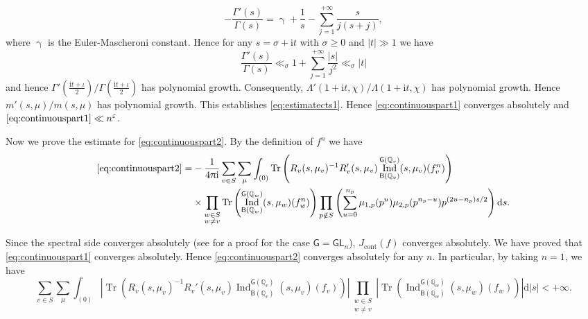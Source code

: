 \documentclass[10pt,oneside,reqno]{amsart}
\makeatletter
\newcommand\rmd{\mathrm{d}}
\newcommand\rmi{\mathrm{i}}
\newcommand\QQ{\mathbb{Q}}
\newcommand\B{\mathsf{B}}
\newcommand\G{\mathsf{G}}
\newcommand\GL{\mathsf{GL}}
\DeclareMathOperator\Tr{Tr}
\DeclareMathOperator\Ind{Ind}
\renewcommand\geq{\geqslant}
\theoremstyle{THEOREM}
\theoremstyle{DEFINITION}
\theoremstyle{EXERCISE}
\numberwithin{equation}{section}
\renewenvironment{proof}[1][\proofname]{\par
  \vspace{-6pt}
  \pushQED{\qed}
  \normalfont \topsep6\p@\@plus6\p@\relax
  \trivlist
  \item[\hskip\labelsep\rmfamily\bfseries
    #1\@addpunct{:}]\ignorespaces
}{
  \popQED\endtrivlist\@endpefalse
  \vspace{-6pt}
}
\makeatother
\begin{document}
\begin{proof}[Proof of \autoref{prop:continuouspart}]
\[
-\frac{\Gamma'(s)}{\Gamma(s)}=\upgamma+\frac{1}{s}-\sum_{j=1}^{+\infty}\frac{s}{j(s+j)},
\]
where $\upgamma$ is the Euler-Mascheroni constant. Hence for any $s=\sigma+\rmi t$ with $\sigma\geq 0$ and $|t|\gg 1$ we have
\[
\frac{\Gamma'(s)}{\Gamma(s)}\ll_\sigma 1+\sum_{j=1}^{+\infty}\frac{|s|}{j^2}\ll_\sigma |t|
\]
and hence $\Gamma'(\frac{\rmi t+\iota}{2})/\Gamma(\frac{\rmi t+\iota}{2})$ has polynomial growth. Consequently, $\Lambda'(1+\rmi t,\chi)/\Lambda (1+\rmi t,\chi)$ has polynomial growth. Hence $m'(s,\mu)/m(s,\mu)$ has polynomial growth. This establishes \eqref{eq:estimatects1}. Hence \eqref{eq:continuouspart1} converges absolutely and $\eqref{eq:continuouspart1}\ll n^\varepsilon$. 

Now we prove the estimate for \eqref{eq:continuouspart2}. By the definition of $f^n$ we have
\begin{align*}
   \eqref{eq:continuouspart2}= & -\frac{1}{4\uppi\rmi}\sum_{v\in S}\sum_{\mu}\int_{(0)}\Tr \left(R_v(s,\mu_v)^{-1}R_v'(s,\mu_v)\Ind_{\B(\QQ_v)}^{\G(\QQ_v)}(s,\mu_v)(f^n_v)\right) \\
     &\times \prod_{\substack{w\in S\\w\neq v}}\Tr\left(\Ind_{\B(\QQ_w)}^{\G(\QQ_w)}(s,\mu_w)(f^n_w)\right)\prod_{p\notin S}\left(\sum_{u=0}^{n_p}\mu_{1,p}(p^u)\mu_{2,p}(p^{n_p-u}) p^{(2u-n_p)s/2}\right)\rmd s.
\end{align*}

Since the spectral side converges absolutely (see \cite{muller2004} for a proof for the case $\G=\GL_n$), $J_{\mathrm{cont}}(f)$ converges absolutely. We have proved that \eqref{eq:continuouspart1} converges absolutely. Hence \eqref{eq:continuouspart2} converges absolutely for any $n$. In particular, by taking $n=1$, we have
\[
\sum_{v\in S}\sum_{\mu}\int_{(0)}\left|\Tr \left(R_v(s,\mu_v)^{-1}R_v'(s,\mu_v)\Ind_{\B(\QQ_v)}^{\G(\QQ_v)}(s,\mu_v)(f_v)\right)\right|\prod_{\substack{w\in S\\w\neq v}}\left|\Tr\left(\Ind_{\B(\QQ_w)}^{\G(\QQ_w)}(s,\mu_w)(f_w)\right)\right|\rmd |s|<+\infty.
\]


\end{proof}
\end{document}
